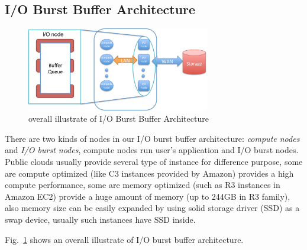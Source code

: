 \subsection{I/O Burst Buffer Architecture}

\begin{figure}[tb]
	\centering
	\includegraphics[width=8cm]{img/architecture_overview}
	\caption{overall illustrate of I/O Burst Buffer Architecture}
	\label{architecture:overview}
\end{figure}

There are two kinds of nodes in our I/O burst buffer architecture: \emph{compute nodes} and \emph{I/O burst nodes}, compute nodes run user's application and I/O burst nodes.
Public clouds usually provide several type of instance for difference purpose, some are compute
optimized (like C3 instances provided by Amazon) provides a high compute performance, some are memory optimized (such as R3 instances in Amazon EC2) provide a huge amount of memory (up
to 244GB in R3 family), also memory size can be easily expanded by using solid storage driver (SSD)
as a swap device, usually such instances have SSD inside.

Fig.~\ref{architecture:overview} shows an overall illustrate of I/O burst buffer architecture.